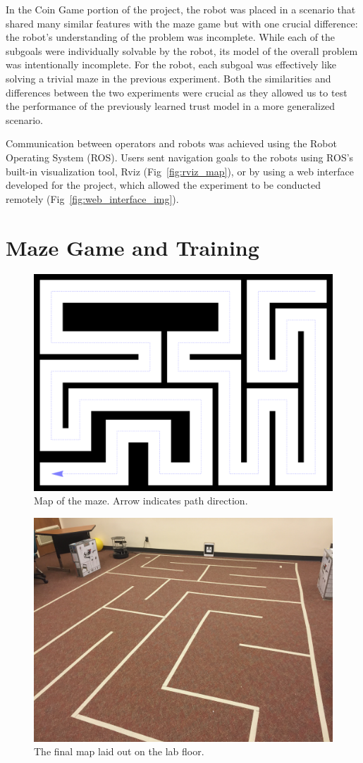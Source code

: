 \documentclass{sig-alternate}
\begin{document}
In the Coin Game portion of the project, the robot was placed in a
scenario that shared many similar features with the maze game but with
one crucial difference: the robot's understanding of the problem was
incomplete. While each of the subgoals were individually solvable by
the robot, its model of the overall problem was intentionally
incomplete. For the robot, each subgoal was effectively like solving a
trivial maze in the previous experiment. Both the similarities and
differences between the two experiments were crucial as they allowed
us to test the performance of the previously learned trust model in a
more generalized scenario.

Communication between operators and robots was achieved using the
Robot Operating System (ROS)\cite{quigley2009ros}.  Users sent
navigation goals to the robots using ROS's built-in visualization
tool, Rviz (Fig~\ref{fig:rviz_map}), or by using a web interface
developed for the project, which allowed the experiment to be
conducted remotely (Fig~\ref{fig:web_interface_img}).

\section{Maze Game and Training}
  
\begin{figure}
\centering
\includegraphics[width=.5\textwidth]{maze-representation.png}
\caption{Map of the maze.  Arrow indicates path direction.}
\label{fig:maze_with_path}
\end{figure}

\begin{figure}
\centering 
\includegraphics[width=.5\textwidth]{tape_map.JPG} 
\caption{The final map laid out on the lab floor.}
\label{fig:map_floor_img}
\end{figure}
\end{document}
